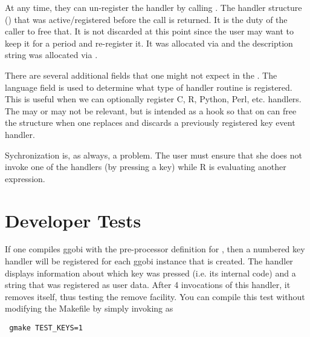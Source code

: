 \documentclass{article}
\begin{document}
At any time, they can un-register the handler by calling
.  The handler
structure () that was active/registered
before the call is returned. It is the duty of the caller to free
that.  It is not discarded at this point since the user may want to
keep it for a period and re-register it. It was allocated via
 and the description string was allocated via
.

There are several additional fields that one might not expect in the
.  The language field is used to determine
what type of handler routine is registered. This is useful when we can
optionally register C, R, Python, Perl, etc. handlers.  The
 may or may not be relevant, but is intended as a
hook so that on can free the  structure when one
replaces and discards a previously registered key event handler.


Sychronization is, as always, a problem. The user must ensure that she
does not invoke one of the handlers (by pressing a key) while R is
evaluating another expression.


\section{Developer Tests}

If one compiles ggobi with the pre-processor definition for
, then a numbered key handler will be registered
for each ggobi instance that is created.  The handler displays
information about which key was pressed (i.e. its internal code) and a
string that was registered as user data. After 4 invocations of this
handler, it removes itself, thus testing the remove facility.
You can compile this test without modifying the Makefile
by simply invoking  as
\begin{verbatim}
 gmake TEST_KEYS=1
\end{verbatim}
\end{document}
